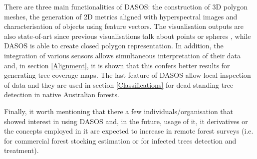 \documentclass{subfiles}
\begin{document}
	   	\par There are three main functionalities of DASOS: the construction of 3D polygon meshes, the generation of 2D metrics aligned with hyperspectral images and characterisation of objects using feature vectors. The visualisation outputs are also state-of-art since previous visualisations talk about points \cite{Bunting2013} or spheres \cite{Chauve2009}, while DASOS is able to create closed polygon representation. In addition, the integration of various sensors allows simultaneous interpretation of their data and, in section \ref{Alignment}, it is shown that this confers better results for generating tree coverage maps. The last feature of DASOS allow local inspection of data and they are used in section \ref{Classifications} for dead standing tree detection in native Australian forests.
	   		
	   	\par Finally, it worth mentioning that there a few individuals/organisation that showed interest in using DASOS and, in the future, usage of it, it derivatives or the concepts employed in it are expected to increase in remote forest surveys (i.e. for commercial forest stocking estimation or for infected trees detection and treatment).
	   	
\end{document}
